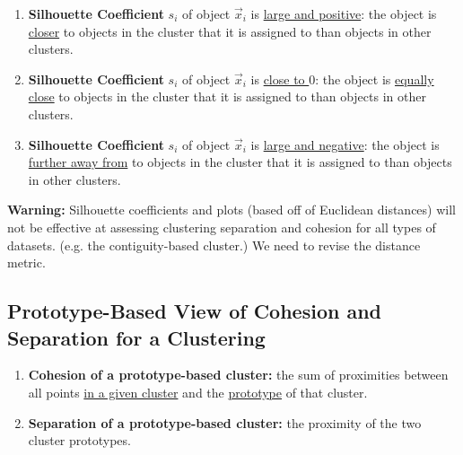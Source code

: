 \documentclass[11pt]{elegantbook}
\begin{document}
\begin{enumerate}
    \item \textbf{Silhouette Coefficient} $s_i$ of object $\vec{x}_i$ is \underline{large and positive}: the object is \underline{closer} to objects in the cluster that it is assigned to than objects in other clusters.
    \item \textbf{Silhouette Coefficient} $s_i$ of object $\vec{x}_i$ is \underline{close to $0$}: the object is \underline{equally close} to objects in the cluster that it is assigned to than objects in other clusters.
    \item \textbf{Silhouette Coefficient} $s_i$ of object $\vec{x}_i$ is \underline{large and negative}: the object is \underline{further away from} to objects in the cluster that it is assigned to than objects in other clusters.
\end{enumerate}
\textbf{Warning:} Silhouette coefficients and plots (based off of Euclidean distances) will not be effective at assessing clustering separation and cohesion for all types of datasets. (e.g. the contiguity-based cluster.) We need to revise the distance metric.

\subsection{Prototype-Based View of Cohesion and Separation for a Clustering}
\begin{enumerate}
    \item \textbf{Cohesion of a prototype-based cluster:} the sum of proximities between all points \underline{in a given cluster} and the \underline{prototype} of that cluster.
    \item \textbf{Separation of a prototype-based cluster:} the proximity of the two cluster prototypes.
\end{enumerate}
\end{document}
